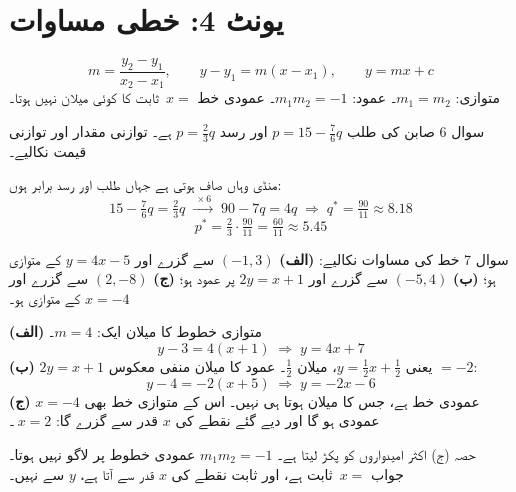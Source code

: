 \section*{یونٹ \textenglish{4}: خطی مساوات}

\begin{nukta}
\[
m=\frac{y_2-y_1}{x_2-x_1},\qquad y-y_1=m(x-x_1),\qquad y=mx+c
\]
متوازی: \(m_1=m_2\)۔ عمود: \(m_1m_2=-1\)۔ عمودی خط \(x=\)~ثابت کا کوئی میلان
نہیں ہوتا۔
\end{nukta}

\begin{sawal}{سوال \textenglish{6}}
صابن کی طلب \(p=15-\tfrac76 q\) اور رسد \(p=\tfrac23 q\) ہے۔ توازنی مقدار اور
توازنی قیمت نکالیے۔
\end{sawal}

\begin{hal}
منڈی وہاں صاف ہوتی ہے جہاں طلب اور رسد برابر ہوں:
\[
15-\tfrac76 q=\tfrac23 q
\;\xrightarrow{\ \times 6\ }\;
90-7q=4q \;\Longrightarrow\; q^{*}=\tfrac{90}{11}\approx 8.18
\]
\[
p^{*}=\tfrac23\cdot\tfrac{90}{11}=\tfrac{60}{11}\approx 5.45
\]

\end{hal}

\begin{sawal}{سوال \textenglish{7}}
خط کی مساوات نکالیے: \textbf{(الف)} \((-1,3)\) سے گزرے اور \(y=4x-5\) کے متوازی
ہو؛ \textbf{(ب)} \((-5,4)\) سے گزرے اور \(2y=x+1\) پر عمود ہو؛
\textbf{(ج)} \((2,-8)\) سے گزرے اور \(x=-4\) کے متوازی ہو۔
\end{sawal}

\begin{hal}
\textbf{(الف)} متوازی خطوط کا میلان ایک: \(m=4\)۔
\[
y-3=4(x+1) \;\Longrightarrow\; y=4x+7
\]
\textbf{(ب)} \(2y=x+1\) یعنی \(y=\tfrac12 x+\tfrac12\)، میلان \(\tfrac12\)۔
عمود کا میلان منفی معکوس \(=-2\):
\[
y-4=-2(x+5) \;\Longrightarrow\; y=-2x-6
\]
\textbf{(ج)} \(x=-4\) عمودی خط ہے، جس کا میلان ہوتا ہی نہیں۔ اس کے متوازی خط بھی
عمودی ہو گا اور دیے گئے نقطے کی \(x\) قدر سے گزرے گا: \(\ x=2\)۔

\end{hal}

\begin{ghalti}
حصہ (ج) اکثر امیدواروں کو پکڑ لیتا ہے۔ \(m_1m_2=-1\) عمودی خطوط پر لاگو نہیں
ہوتا۔ جواب \(x=\)~ثابت ہے، اور ثابت نقطے کی \(x\) قدر سے آتا ہے، \(y\) سے نہیں۔
\end{ghalti}

